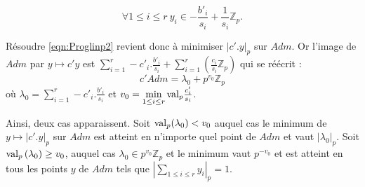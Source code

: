 \[ \boxed{ 
\forall 1 \le i\le r \ y_i \in -\frac{b'_i}{s_i} + \frac{1}{s_i} \mathbb{Z}_p
}.\]  

Résoudre \ref{eqn:Proglinp2} revient donc à minimiser $|c'.y|_p$ sur $Adm$. Or l'image de $Adm$ par $y \mapsto c'y$ est $\sum_{i=1}^r -c'_i.\frac{b'_i}{s_i} + \sum_{i=1}^r\left( \frac{c_i}{s_{i}} \mathbb{Z}_p \right)$ qui se réécrit :
$$c'Adm = \lambda_0 + p^{v_0} \mathbb{Z}_p$$
où $\lambda_0 = \sum\limits_{i=1}^r -c'_i.\frac{b'_i}{s_i}$ et $v_{0} = \min\limits_{1\le i\le r} \text{val}_p \frac{c'_{i}}{s_{i}} $.

Ainsi, deux cas apparaissent. Soit $\text{val}_p( \lambda_0) < v_0$ auquel cas le minimum de $y\mapsto |c'.y|_p$ sur $Adm$ est atteint en n'importe quel point de $Adm$ et vaut $| \lambda_0|_p$. Soit $\text{val}_p\left( \lambda_0 \right) \ge v_0$, auquel cas $\lambda_0 \in p^{v_0} \mathbb{Z}_p$ et le minimum vaut $p^{-v_0} $ et est atteint en tous les points $y$ de $Adm$ tels que $\left|\sum \limits_{1\le i\le r} y_{i}\right|_p = 1$.

